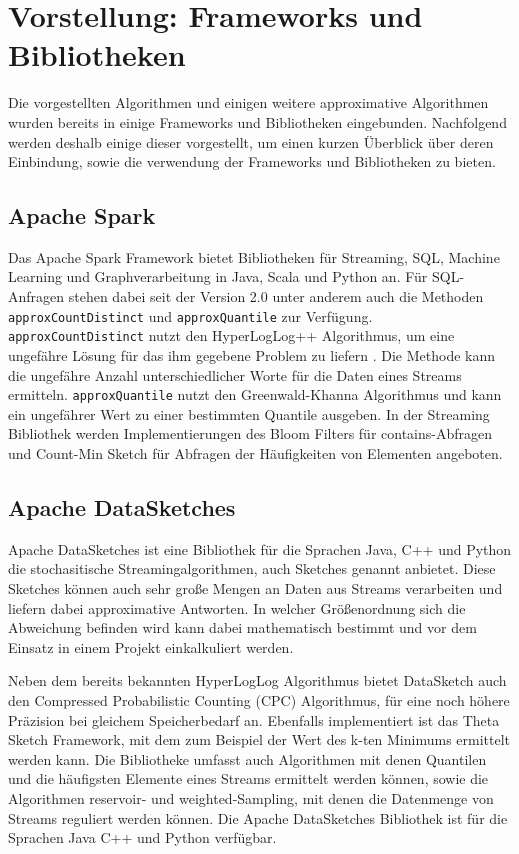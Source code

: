 \section{Vorstellung: Frameworks und Bibliotheken}
Die vorgestellten Algorithmen und einigen weitere approximative Algorithmen wurden bereits in einige Frameworks und Bibliotheken eingebunden. Nachfolgend werden deshalb einige dieser vorgestellt, um einen kurzen Überblick über deren Einbindung, sowie die verwendung der Frameworks und Bibliotheken zu bieten.

\subsection{Apache Spark}
Das Apache Spark Framework bietet Bibliotheken für Streaming, SQL, Machine Learning und Graphverarbeitung in Java, Scala und Python an. 
Für SQL-Anfragen stehen dabei seit der Version 2.0 unter anderem auch die Methoden  \texttt{approxCountDistinct} 
und \texttt{approxQuantile} zur Verfügung. 
\texttt{approxCountDistinct} nutzt den HyperLogLog++ Algorithmus, 
um eine ungefähre Lösung für das ihm gegebene Problem zu liefern \cite{hunter2016}.
Die Methode kann die ungefähre Anzahl unterschiedlicher Worte für die Daten eines Streams ermitteln.
\texttt{approxQuantile} nutzt den Greenwald-Khanna Algorithmus \cite{greenwald2001} 
und kann ein ungefährer Wert zu einer bestimmten Quantile ausgeben.
In der Streaming Bibliothek werden Implementierungen des Bloom Filters für contains-Abfragen und Count-Min Sketch für Abfragen der Häufigkeiten von Elementen angeboten.


\subsection{Apache DataSketches}
Apache DataSketches ist eine Bibliothek für die Sprachen Java, C++ und Python die stochasitische Streamingalgorithmen, 
auch Sketches genannt anbietet. 
Diese Sketches können auch sehr große Mengen an Daten aus Streams verarbeiten 
und liefern dabei approximative Antworten. 
In welcher Größenordnung sich die Abweichung befinden wird kann dabei mathematisch bestimmt 
und vor dem Einsatz in einem Projekt einkalkuliert werden.

Neben dem bereits bekannten HyperLogLog Algorithmus bietet DataSketch auch den Compressed Probabilistic Counting (CPC) Algorithmus, 
für eine noch höhere Präzision bei gleichem Speicherbedarf an.
Ebenfalls implementiert ist das Theta Sketch Framework, 
mit dem zum Beispiel der Wert des k-ten Minimums ermittelt werden kann.
Die Bibliotheke umfasst auch Algorithmen mit denen Quantilen und die häufigsten Elemente eines Streams ermittelt werden können, 
sowie die Algorithmen reservoir- und weighted-Sampling, mit denen die Datenmenge von Streams reguliert werden können.
Die Apache DataSketches Bibliothek ist für die Sprachen Java C++ und Python verfügbar.

